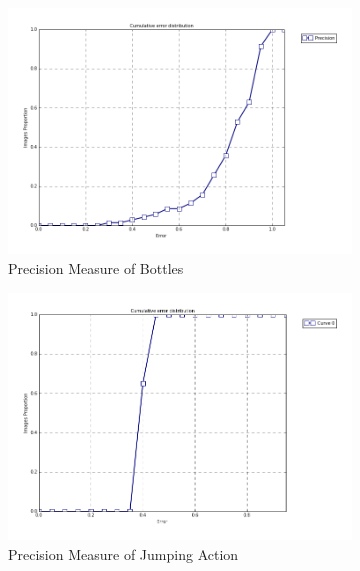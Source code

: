 \begin{figure}[h]
    \centering
    \begin{subfigure}[b]{0.1\textwidth}
            \includegraphics[width=\textwidth]{supports/Segmentation_Measure/bottle_seg}
        \caption{Precision Measure of Bottles}
    \end{subfigure}
    \qquad
    \begin{subfigure}[b]{0.1\textwidth}
            \includegraphics[width=\textwidth]{supports/Segmentation_Measure/body_jump_seg}
        \caption{Precision Measure of Jumping Action}
    \end{subfigure}
    \qquad
    \begin{subfigure}[b]{0.1\textwidth}

\end{subfigure}
\end{figure}
